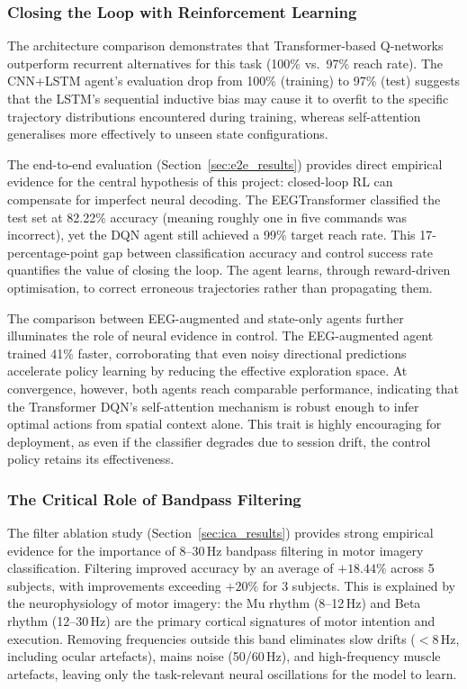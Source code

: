 \documentclass[12pt, a4paper]{article}
\begin{document}
\subsubsection{Closing the Loop with Reinforcement Learning}

The architecture comparison demonstrates that Transformer-based Q-networks outperform recurrent alternatives for this task (100\% vs.~97\% reach rate). The CNN+LSTM agent's evaluation drop from 100\% (training) to 97\% (test) suggests that the LSTM's sequential inductive bias may cause it to overfit to the specific trajectory distributions encountered during training, whereas self-attention generalises more effectively to unseen state configurations.

The end-to-end evaluation (Section~\ref{sec:e2e_results}) provides direct empirical evidence for the central hypothesis of this project: closed-loop RL can compensate for imperfect neural decoding. The EEGTransformer classified the test set at 82.22\% accuracy (meaning roughly one in five commands was incorrect), yet the DQN agent still achieved a 99\% target reach rate. This 17-percentage-point gap between classification accuracy and control success rate quantifies the value of closing the loop. The agent learns, through reward-driven optimisation, to correct erroneous trajectories rather than propagating them.

The comparison between EEG-augmented and state-only agents further illuminates the role of neural evidence in control. The EEG-augmented agent trained 41\% faster, corroborating that even noisy directional predictions accelerate policy learning by reducing the effective exploration space. At convergence, however, both agents reach comparable performance, indicating that the Transformer DQN's self-attention mechanism is robust enough to infer optimal actions from spatial context alone. This trait is highly encouraging for deployment, as even if the classifier degrades due to session drift, the control policy retains its effectiveness.

\subsubsection{The Critical Role of Bandpass Filtering}

The filter ablation study (Section~\ref{sec:ica_results}) provides strong empirical evidence for the importance of 8--30\,Hz bandpass filtering in motor imagery classification. Filtering improved accuracy by an average of $+18.44\%$ across 5 subjects, with improvements exceeding $+20\%$ for 3 subjects. This is explained by the neurophysiology of motor imagery: the Mu rhythm (8--12\,Hz) and Beta rhythm (12--30\,Hz) are the primary cortical signatures of motor intention and execution. Removing frequencies outside this band eliminates slow drifts ($<$8\,Hz, including ocular artefacts), mains noise (50/60\,Hz), and high-frequency muscle artefacts, leaving only the task-relevant neural oscillations for the model to learn.
\end{document}
